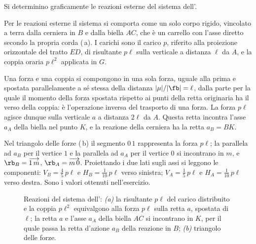 \begin{esempio}
	\label{ese:tre_forze_sgr}
	Si determinino graficamente le reazioni esterne del sistema dell'.

	\begin{svolgimento}
		Per le reazioni esterne il sistema si comporta come un solo corpo rigido, vincolato a terra
		dalla cerniera in $B$ e dalla biella $AC$, che è un carrello con l'asse diretto secondo la
		propria corda (\,a). I carichi sono il carico $p$, riferito alla
		proiezione orizzontale del tratto $ED$, di risultante $p\ell$ sulla verticale a distanza $\ell$
		da $A$, e la coppia oraria $p\ell^2$ applicata in $G$.

		Una forza e una coppia si compongono in una sola forza, uguale alla prima e spostata
		parallelamente a sé stessa della distanza $|\mu|/|\fb| = \ell$, dalla parte per la quale il
		momento della forza spostata rispetto ai punti della retta originaria ha il verso della coppia:
		è l'operazione inversa del trasporto di una forza. La forza $p\ell$ agisce dunque sulla
		verticale $a$ a distanza $2\ell$ da $A$. Questa retta incontra l'asse $a_A$ della biella nel
		punto $K$, e la reazione della cerniera ha la retta $a_B = BK$.

		Nel triangolo delle forze (\,b) il segmento $0\,1$ rappresenta la
		forza $p\ell$; la parallela ad $a_B$ per il vertice $1$ e la parallela ad $a_A$ per il vertice
		$0$ si incontrano in $m$, e $\rb_B = \overrightarrow{1\,m}$, $\rb_A = \overrightarrow{m\,0}$.
		Proiettando i due lati sugli assi si leggono le componenti: $V_B = \tfrac{4}{5}\,p\ell$ e
		$H_B = \tfrac{1}{10}\,p\ell$ verso sinistra; $V_A = \tfrac{1}{5}\,p\ell$ e
		$H_A = \tfrac{1}{10}\,p\ell$ verso destra. Sono i valori ottenuti nell'esercizio.
	\end{svolgimento}
\end{esempio}

\begin{figure}[htbp]
	\centering
	\caption{Reazioni del sistema dell': \emph{(a)} la risultante
		$p\ell$ del carico distribuito e la coppia $p\ell^2$ equivalgono alla forza $p\ell$ sulla retta
		$a$, spostata di $\ell$; la retta $a$ e l'asse $a_A$ della biella $AC$ si incontrano in $K$,
		per il quale passa la retta d'azione $a_B$ della reazione in $B$; \emph{(b)} triangolo delle
		forze.}
	\label{fig:tre_forze_sgr}
\end{figure}

